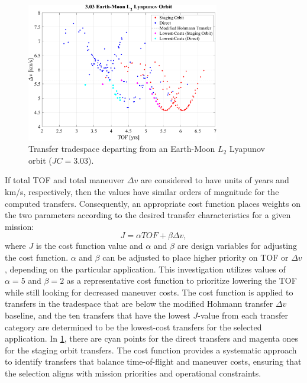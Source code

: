 \begin{figure}[H]
    \centering
    \includegraphics[width=0.75\textwidth]{figures/TradeSpace_L2Lyapunov_3_03.pdf}
    \caption{Transfer tradespace departing from an Earth-Moon $L_{2}$ Lyapunov orbit ($JC=3.03$).}
    \label{fig:lowDeltav}
\end{figure}

If total TOF and total maneuver $\Delta v$ are considered to have units of years and km/s,
respectively, then the values have similar orders of magnitude for the computed transfers.
Consequently, an appropriate cost function places weights on the two parameters according to the
desired transfer characteristics for a given mission:
\begin{equation}
    J=\alpha TOF+\beta\Delta v,
    \label{eq:costfunction}
\end{equation}
where $J$ is the cost function value and $\alpha$ and $\beta$ are design variables for adjusting
the cost function. $\alpha$ and $\beta$ can be adjusted to place higher priority on TOF or
$\Delta v$, depending on the particular application. This investigation utilizes values of
$\alpha=5$ and $\beta=2$ as a representative cost function to prioritize lowering the TOF while
still looking for decreased maneuver costs. The cost function is applied to transfers in the
tradespace that are below the modified Hohmann transfer $\Delta v$ baseline, and the ten transfers
that have the lowest $J$-value from each transfer category are determined to be the lowest-cost
transfers for the selected application. In \cref{fig:lowDeltav}, there are cyan points for the
direct transfers and magenta ones for the staging orbit transfers. The cost function provides a
systematic approach to identify transfers that balance time-of-flight and maneuver costs, ensuring
that the selection aligns with mission priorities and operational constraints.

